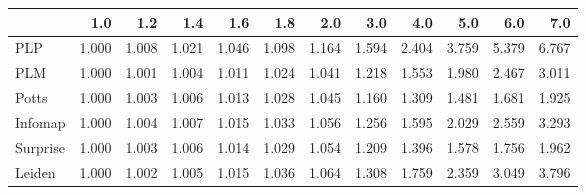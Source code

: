 \begin{tabular}{lrrrrrrrrrrr}
\toprule
{} &   1.0 &   1.2 &   1.4 &   1.6 &   1.8 &   2.0 &   3.0 &   4.0 &   5.0 &   6.0 &   7.0 \\
\midrule
PLP      & 1.000 & 1.008 & 1.021 & 1.046 & 1.098 & 1.164 & 1.594 & 2.404 & 3.759 & 5.379 & 6.767 \\
PLM      & 1.000 & 1.001 & 1.004 & 1.011 & 1.024 & 1.041 & 1.218 & 1.553 & 1.980 & 2.467 & 3.011 \\
Potts    & 1.000 & 1.003 & 1.006 & 1.013 & 1.028 & 1.045 & 1.160 & 1.309 & 1.481 & 1.681 & 1.925 \\
Infomap  & 1.000 & 1.004 & 1.007 & 1.015 & 1.033 & 1.056 & 1.256 & 1.595 & 2.029 & 2.559 & 3.293 \\
Surprise & 1.000 & 1.003 & 1.006 & 1.014 & 1.029 & 1.054 & 1.209 & 1.396 & 1.578 & 1.756 & 1.962 \\
Leiden   & 1.000 & 1.002 & 1.005 & 1.015 & 1.036 & 1.064 & 1.308 & 1.759 & 2.359 & 3.049 & 3.796 \\
\bottomrule
\end{tabular}
